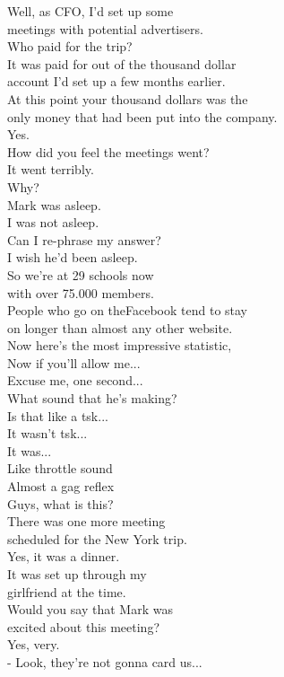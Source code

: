 \documentclass{article}
\begin{document}
\begin{multicols}{3}
Well, as CFO, I'd set up some\\
meetings with potential advertisers.\\
Who paid for the trip?\\
It was paid for out of the thousand dollar\\
account I'd set up a few months earlier.\\
At this point your thousand dollars was the\\
only money that had been put into the company.\\
Yes.\\
How did you feel the meetings went?\\
It went terribly.\\
Why?\\
Mark was asleep.\\
I was not asleep.\\
Can I re-phrase my answer?\\
I wish he'd been asleep.\\
So we're at 29 schools now\\
with over 75.000 members.\\
People who go on theFacebook tend to stay\\
on longer than almost any other website.\\
Now here's the most impressive statistic,\\
Now if you'll allow me...\\
Excuse me, one second...\\
What sound that he's making?\\
Is that like a tsk...\\
It wasn't tsk...\\
It was...\\
Like throttle sound\\
Almost a gag reflex\\
Guys, what is this?\\
There was one more meeting\\
scheduled for the New York trip.\\
Yes, it was a dinner.\\
It was set up through my\\
girlfriend at the time.\\
Would you say that Mark was\\
excited about this meeting?\\
Yes, very.\\
- Look, they're not gonna card us...\\

\end{multicols}
\end{document}
